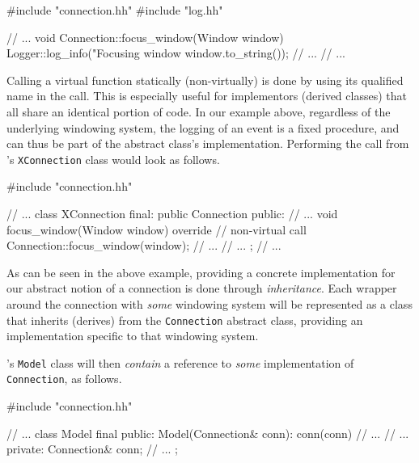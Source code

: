 
\begin{cppblock}
  #include "connection.hh"
  #include "log.hh"

  // ...
  void
  Connection::focus_window(Window window)
  {
    Logger::log_info("Focusing window %
      window.to_string());
    // ...
  }
  // ...
\end{cppblock}

Calling  a virtual  function statically  (non-virtually)  is done  by using  its
qualified name in the call. This  is especially useful for implementors (derived
classes) that  all share  an identical  portion of code.  In our  example above,
regardless of  the underlying  windowing system,  the logging of  an event  is a
fixed procedure,  and can thus be  part of the abstract  class's implementation.
Performing the call from \wmcpp's \texttt{XConnection} class would look
as follows.

\begin{cppblock}
  #include "connection.hh"

  // ...
  class XConnection final: public Connection
  {
  public:
    // ...
    void focus_window(Window window) override {
      // non-virtual call
      Connection::focus_window(window);
      // ...
    }
    // ...
  };
  // ...
\end{cppblock}

As can  be seen in  the above example,  providing a concrete  implementation for
our  abstract  notion of  a  connection  is done  through  \textit{inheritance}.
Each  wrapper   around  the  connection  with   \textit{some}  windowing  system
will   be  represented   as   a   class  that   inherits   (derives)  from   the
\texttt{Connection}   abstract  class,   providing  an   implementation
specific to that windowing system.

\wmcpp's \texttt{Model} class will then \textit{contain} a reference to
\textit{some} implementation of \texttt{Connection}, as follows.

\begin{cppblock}
  #include "connection.hh"

  // ...
  class Model final
  {
  public:
    Model(Connection& conn): conn(conn) {
      // ...
    }
    // ...
  private:
    Connection& conn;
    // ...
  };
\end{cppblock}


